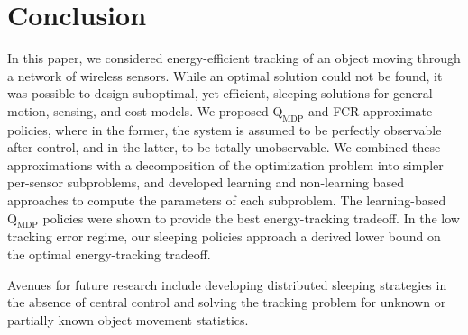 \documentclass[journal,draftcls,onecolumn,11pt]{IEEEtran}
\newcommand{\QMDP}{$\text{Q}_{\text{MDP}}$}
\begin{document}
\section{Conclusion} \label{sec:concl}
In this paper, we considered energy-efficient tracking of an object moving through a network of wireless sensors. While an optimal solution could not be found, it was possible to design suboptimal, yet efficient, sleeping solutions for general motion, sensing, and cost models. We proposed \QMDP{} and FCR approximate policies, where in the former, the system is assumed to be perfectly observable after control, and in the latter, to be  totally unobservable. We combined these approximations with a decomposition of the optimization problem into simpler per-sensor subproblems, and developed learning and non-learning based approaches to compute the parameters of each subproblem. The learning-based \QMDP{} policies were shown to provide the best energy-tracking tradeoff. In the low tracking error regime, our sleeping policies approach a derived lower bound on the optimal energy-tracking tradeoff. 

Avenues for future research include developing distributed sleeping strategies in the absence of central control and solving the tracking problem for unknown or partially known object movement statistics.



\end{document}
